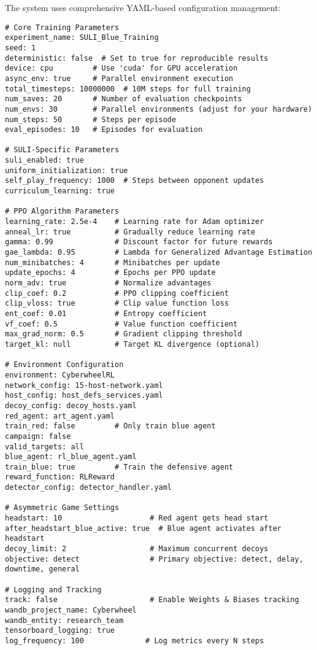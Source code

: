 \documentclass[12pt,a4paper]{article}
\begin{document}
The system uses comprehensive YAML-based configuration management:

\begin{lstlisting}[caption=Complete Training Configuration]
# Core Training Parameters
experiment_name: SULI_Blue_Training
seed: 1
deterministic: false  # Set to true for reproducible results
device: cpu         # Use 'cuda' for GPU acceleration
async_env: true     # Parallel environment execution
total_timesteps: 10000000  # 10M steps for full training
num_saves: 20       # Number of evaluation checkpoints
num_envs: 30        # Parallel environments (adjust for your hardware)
num_steps: 50       # Steps per episode
eval_episodes: 10   # Episodes for evaluation

# SULI-Specific Parameters
suli_enabled: true
uniform_initialization: true
self_play_frequency: 1000  # Steps between opponent updates
curriculum_learning: true

# PPO Algorithm Parameters
learning_rate: 2.5e-4    # Learning rate for Adam optimizer
anneal_lr: true          # Gradually reduce learning rate
gamma: 0.99              # Discount factor for future rewards
gae_lambda: 0.95         # Lambda for Generalized Advantage Estimation
num_minibatches: 4       # Minibatches per update
update_epochs: 4         # Epochs per PPO update
norm_adv: true           # Normalize advantages
clip_coef: 0.2           # PPO clipping coefficient
clip_vloss: true         # Clip value function loss
ent_coef: 0.01           # Entropy coefficient
vf_coef: 0.5             # Value function coefficient
max_grad_norm: 0.5       # Gradient clipping threshold
target_kl: null          # Target KL divergence (optional)

# Environment Configuration
environment: CyberwheelRL
network_config: 15-host-network.yaml
host_config: host_defs_services.yaml
decoy_config: decoy_hosts.yaml
red_agent: art_agent.yaml
train_red: false         # Only train blue agent
campaign: false
valid_targets: all
blue_agent: rl_blue_agent.yaml
train_blue: true         # Train the defensive agent
reward_function: RLReward
detector_config: detector_handler.yaml

# Asymmetric Game Settings
headstart: 10                    # Red agent gets head start
after_headstart_blue_active: true  # Blue agent activates after headstart
decoy_limit: 2                   # Maximum concurrent decoys
objective: detect                # Primary objective: detect, delay, downtime, general

# Logging and Tracking
track: false                     # Enable Weights & Biases tracking
wandb_project_name: Cyberwheel
wandb_entity: research_team
tensorboard_logging: true
log_frequency: 100              # Log metrics every N steps
\end{lstlisting}
\end{document}
